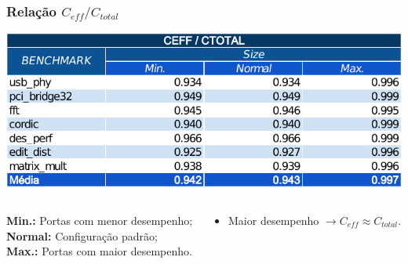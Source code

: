 \documentclass[10pt,a4paper]{beamer}
\begin{document}
		
		\begin{frame}[t]
			\frametitle{Relação $C_{eff} / C_{total}$}
			\begin{center}
				\includegraphics[width=0.9\linewidth]{img/ceff_ratio/ceff_ctotal_todos.pdf}
				\begin{columns}
					\begin{column}{0.4 \textwidth}
						\begin{shaded}
							\scriptsize{\textbf{Min.:} Portas com menor desempenho;} \\
							\scriptsize{\textbf{Normal:} Configuração padrão;}\\
							\scriptsize{\textbf{Max.:} Portas com maior desempenho.}
						\end{shaded}
					\end{column}
					\begin{column}{0.6 \textwidth}
						\begin{itemize}
							\item Maior desempenho $\to C_{eff} \approx C_{total}$.
						\end{itemize}
					\end{column}
				\end{columns}						
			\end{center}
			
		\end{frame}
		
%			
		
\end{document}
